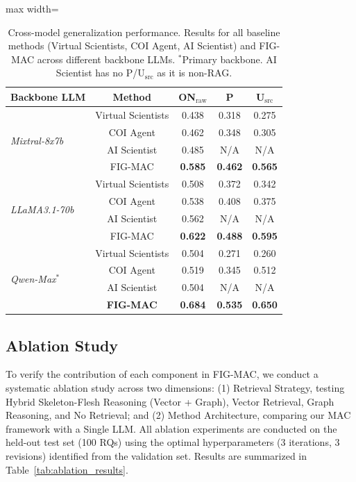 \documentclass[runningheads]{llncs}
\begin{document}
\begin{table}[t]
\centering
\small
\begin{adjustbox}{max width=\textwidth}
\begin{tabular}{lcccc}
\toprule
\textbf{Backbone LLM} & \textbf{Method} & \textbf{ON$_{\text{raw}}$} & \textbf{P} & \textbf{U$_{\text{src}}$} \\
\midrule
\multirow{4}{*}{\textit{Mixtral-8x7b}} 
 & Virtual Scientists & 0.438 & 0.318 & 0.275 \\
 & COI Agent & 0.462 & 0.348 & 0.305 \\
 & AI Scientist & 0.485 & N/A & N/A \\
 & FIG-MAC & \textbf{0.585} & \textbf{0.462} & \textbf{0.565} \\
\midrule
\multirow{4}{*}{\textit{LLaMA3.1-70b}} 
 & Virtual Scientists & 0.508 & 0.372 & 0.342 \\
 & COI Agent & 0.538 & 0.408 & 0.375 \\
 & AI Scientist & 0.562 & N/A & N/A \\
 & FIG-MAC & \textbf{0.622} & \textbf{0.488} & \textbf{0.595} \\
\midrule
\multirow{4}{*}{\textit{Qwen-Max}$^*$} 
 & Virtual Scientists & 0.504 & 0.271 & 0.260 \\
 & COI Agent & 0.519 & 0.345 & 0.512 \\
 & AI Scientist & 0.504 & N/A & N/A \\
 & \textbf{FIG-MAC} & \textbf{0.684} & \textbf{0.535} & \textbf{0.650} \\
\bottomrule
\end{tabular}
\end{adjustbox}
\caption{Cross-model generalization performance. Results for all baseline methods (Virtual Scientists, COI Agent, AI Scientist) and FIG-MAC across different backbone LLMs. $^*$Primary backbone. AI Scientist has no P/U$_{\text{src}}$ as it is non-RAG.}
\label{tab:cross_model}
\end{table}

\subsection{Ablation Study}
\label{sec:ablation}

To verify the contribution of each component in FIG-MAC, we conduct a systematic ablation study across two dimensions: (1) Retrieval Strategy, testing Hybrid Skeleton-Flesh Reasoning (Vector + Graph), Vector Retrieval, Graph Reasoning, and No Retrieval; and (2) Method Architecture, comparing our MAC framework with a Single LLM. All ablation experiments are conducted on the held-out test set (100 RQs) using the optimal hyperparameters (3 iterations, 3 revisions) identified from the validation set. Results are summarized in Table~\ref{tab:ablation_results}.
\end{document}
